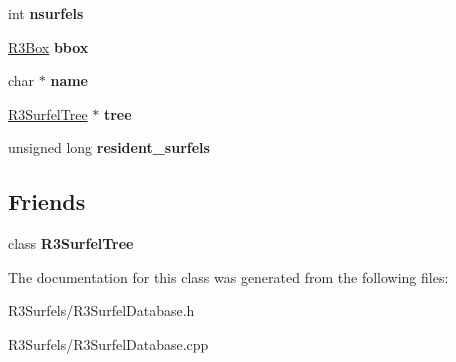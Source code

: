 \begin{DoxyCompactItemize}
\item 
int {\bfseries nsurfels}\hypertarget{class_r3_surfel_database_a270de0a7e95e3cb909e67eb8d0623d66}{}\label{class_r3_surfel_database_a270de0a7e95e3cb909e67eb8d0623d66}

\item 
\hyperlink{class_r3_box}{R3\+Box} {\bfseries bbox}\hypertarget{class_r3_surfel_database_a9a9dca95eabcb6396d656e480272a745}{}\label{class_r3_surfel_database_a9a9dca95eabcb6396d656e480272a745}

\item 
char $\ast$ {\bfseries name}\hypertarget{class_r3_surfel_database_aa4e12e1f121cfe3f1c9c8b5507ee3b39}{}\label{class_r3_surfel_database_aa4e12e1f121cfe3f1c9c8b5507ee3b39}

\item 
\hyperlink{class_r3_surfel_tree}{R3\+Surfel\+Tree} $\ast$ {\bfseries tree}\hypertarget{class_r3_surfel_database_aaec3b65fb3a767a03a116117413c8d9b}{}\label{class_r3_surfel_database_aaec3b65fb3a767a03a116117413c8d9b}

\item 
unsigned long {\bfseries resident\+\_\+surfels}\hypertarget{class_r3_surfel_database_a3593f8e45d057f1d0d87e390ad91d5bf}{}\label{class_r3_surfel_database_a3593f8e45d057f1d0d87e390ad91d5bf}

\end{DoxyCompactItemize}
\subsection*{Friends}
\begin{DoxyCompactItemize}
\item 
class {\bfseries R3\+Surfel\+Tree}\hypertarget{class_r3_surfel_database_afe80cf8b46036b5125f7c9280809ed48}{}\label{class_r3_surfel_database_afe80cf8b46036b5125f7c9280809ed48}

\end{DoxyCompactItemize}


The documentation for this class was generated from the following files\+:\begin{DoxyCompactItemize}
\item 
R3\+Surfels/R3\+Surfel\+Database.\+h\item 
R3\+Surfels/R3\+Surfel\+Database.\+cpp\end{DoxyCompactItemize}
